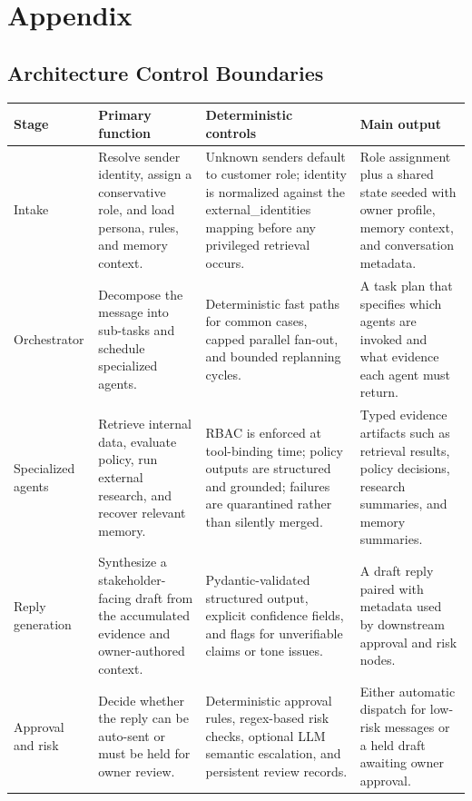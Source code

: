\documentclass[11pt]{article}
\begin{document}
\clearpage
\appendix
\section{Appendix}
\label{sec:appendix}

\subsection{Architecture Control Boundaries}
\label{app:control-table}

\renewcommand{\arraystretch}{1.25}
\begin{tabular}{|p{2.0cm}|p{3.0cm}|p{3.4cm}|p{4.8cm}|}
\hline
\textbf{Stage} & \textbf{Primary function} & \textbf{Deterministic controls} & \textbf{Main output} \\
\hline
Intake & Resolve sender identity, assign a conservative role, and load persona, rules, and memory context. & Unknown senders default to customer role; identity is normalized against the external\_identities mapping before any privileged retrieval occurs. & Role assignment plus a shared state seeded with owner profile, memory context, and conversation metadata. \\
\hline
Orchestrator & Decompose the message into sub-tasks and schedule specialized agents. & Deterministic fast paths for common cases, capped parallel fan-out, and bounded replanning cycles. & A task plan that specifies which agents are invoked and what evidence each agent must return. \\
\hline
Specialized agents & Retrieve internal data, evaluate policy, run external research, and recover relevant memory. & RBAC is enforced at tool-binding time; policy outputs are structured and grounded; failures are quarantined rather than silently merged. & Typed evidence artifacts such as retrieval results, policy decisions, research summaries, and memory summaries. \\
\hline
Reply generation & Synthesize a stakeholder-facing draft from the accumulated evidence and owner-authored context. & Pydantic-validated structured output, explicit confidence fields, and flags for unverifiable claims or tone issues. & A draft reply paired with metadata used by downstream approval and risk nodes. \\
\hline
Approval and risk & Decide whether the reply can be auto-sent or must be held for owner review. & Deterministic approval rules, regex-based risk checks, optional LLM semantic escalation, and persistent review records. & Either automatic dispatch for low-risk messages or a held draft awaiting owner approval. \\
\hline
\end{tabular}
\end{document}
